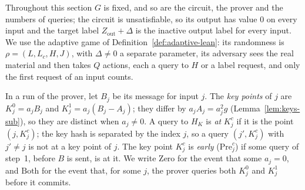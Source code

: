 Throughout this section $G$ is fixed, and so are the circuit, the prover and the numbers of
queries; the circuit is unsatisfiable, so its output has value $0$ on every input and the target
label $Z_{\mathrm{out}} + \Delta$ is the inactive output label for every input. We use the
adaptive game of Definition~\ref{def:adaptive-lean}: its randomness is $\rho = (L, L_c, H, J)$,
with $\Delta \neq 0$ a separate parameter, its adversary sees the real material and then takes $Q$ actions, each a query to $H$ or a
label request, and only the first request of an input counts.

\begin{definition}
  \label{def:co-keys}
  \leanok
  In a run of the prover, let $B_j$ be its message for input $j$. The \emph{key points} of $j$ are
  $K^0_j = a_j B_j$ and $K^1_j = a_j (B_j - A_j)$; they differ by $a_j A_j = a_j^2 g$
  (Lemma~\ref{lem:keys-sub}), so they are distinct when $a_j \neq 0$. A query to $H_K$ is \emph{at}
  $K^c_j$ if it is the point $(j, K^c_j)$; the key hash is separated by the index $j$, so a query
  $(j', K^c_j)$ with $j' \neq j$ is not at a key point of $j$. The key point $K^c_j$ is \emph{early}
  ($\mathrm{Pre}^c_j$) if some query of step~1, before $B$ is sent, is at it. We write
  $\mathrm{Zero}$ for the event that some $a_j = 0$, and $\mathrm{Both}$ for the event that, for
  some $j$, the prover queries both $K^0_j$ and $K^1_j$ before it commits.
\end{definition}

